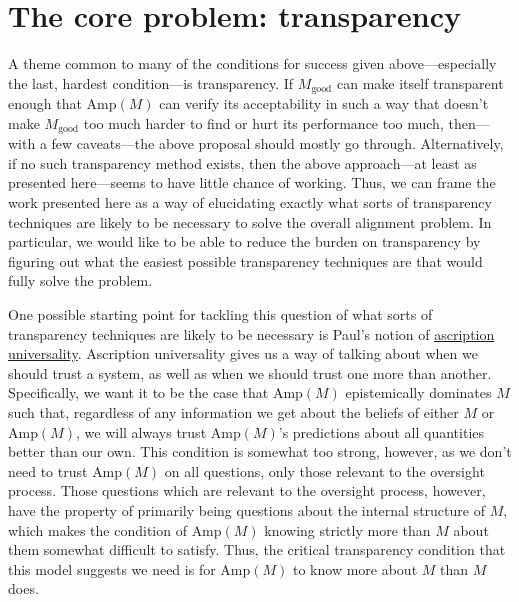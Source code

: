 \documentclass{amsart}
\begin{document}
\section{The core problem: transparency}

A theme common to many of the conditions for success given above---especially the last, hardest condition---is transparency. If $M_\text{good}$ can make itself transparent enough that $\text{Amp}(M)$ can verify its acceptability in such a way that doesn't make $M_\text{good}$ too much harder to find or hurt its performance too much, then---with a few caveats---the above proposal should mostly go through. Alternatively, if no such transparency method exists, then the above approach---at least as presented here---seems to have little chance of working. Thus, we can frame the work presented here as a way of elucidating exactly what sorts of transparency techniques are likely to be necessary to solve the overall alignment problem. In particular, we would like to be able to reduce the burden on transparency by figuring out what the easiest possible transparency techniques are that would fully solve the problem.

One possible starting point for tackling this question of what sorts of transparency techniques are likely to be necessary is Paul's notion of \href{https://ai-alignment.com/towards-formalizing-universality-409ab893a456}{ascription universality}. Ascription universality gives us a way of talking about when we should trust a system, as well as when we should trust one more than another. Specifically, we want it to be the case that $\text{Amp}(M)$ epistemically dominates $M$ such that, regardless of any information we get about the beliefs of either $M$ or $\text{Amp}(M)$, we will always trust $\text{Amp}(M)$'s predictions about all quantities better than our own. This condition is somewhat too strong, however, as we don't need to trust $\text{Amp}(M)$ on all questions, only those relevant to the oversight process. Those questions which are relevant to the oversight process, however, have the property of primarily being questions about the internal structure of $M$, which makes the condition of $\text{Amp}(M)$ knowing strictly more than $M$ about them somewhat difficult to satisfy. Thus, the critical transparency condition that this model suggests we need is for $\text{Amp}(M)$ to know more about $M$ than $M$ does.
\end{document}
